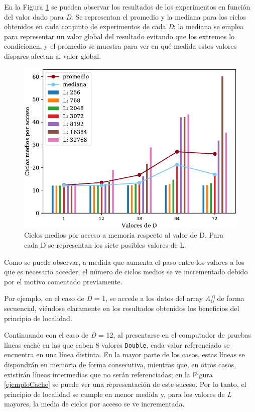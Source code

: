\documentclass[conference]{IEEEtran}
\begin{document}
En la Figura \ref{valoresD} se pueden observar los resultados de los experimentos en función del valor dado para \textit{D}. Se representan el promedio y la mediana para los ciclos obtenidos en cada conjunto de experimentos de cada \textit{D}: la mediana se emplea para representar un valor global del resultado evitando que los extremos lo condicionen, y el promedio se muestra para ver en qué medida estos valores dispares afectan al valor global.

\begin{figure}[htbp]
\centerline{\includegraphics[scale=0.64]{valoresD.pdf}}
\caption{Ciclos medios por acceso a memoria respecto al valor de D. Para cada D se representan los siete posibles valores de L.}
\label{valoresD}
\end{figure}

Como se puede observar, a medida que aumenta el paso entre los valores a los que es necesario acceder, el número de ciclos medios se ve incrementado debido por el motivo comentado previamente.

Por ejemplo, en el caso de \textit{D} = 1, se accede a los datos del array \textit{A[]} de forma secuencial, viéndose claramente en los resultados obtenidos los beneficios del principio de localidad.

Continuando con el caso de \textit{D} = 12, al presentarse en el computador de pruebas líneas caché en las que caben 8 valores \texttt{Double}, cada valor referenciado se encuentra en una línea distinta. En la mayor parte de los casos, estas líneas se dispondrán en memoria de forma consecutiva, mientras que, en otros casos, existirán líneas intermedias que no serán referenciadas; en la Figura \ref{ejemploCache} se puede ver una representación de este suceso. Por lo tanto, el principio de localidad se cumple en menor medida y, para los valores de \textit{L} mayores, la media de ciclos por acceso se ve incrementada.
\end{document}
